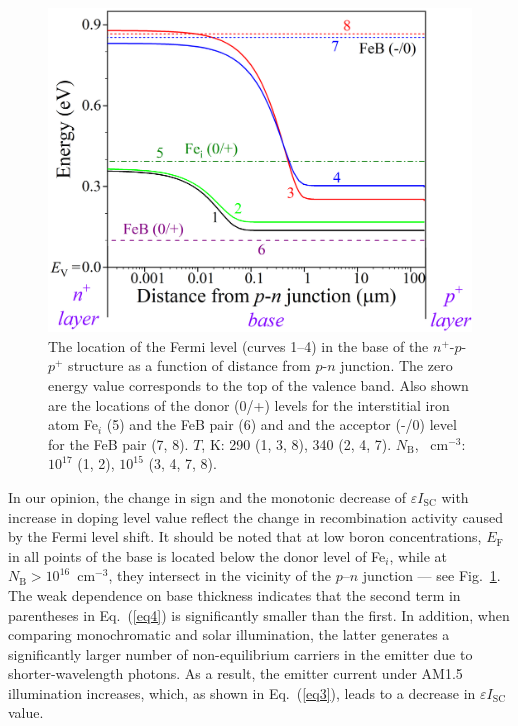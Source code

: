 \documentclass[a4paper,fleqn]{cas-sc}
\begin{document}
\begin{figure}
	\centering
     \includegraphics[width=0.49\linewidth]{Fig4.png}
	  \caption{The location of the Fermi level (curves 1--4) in the base of the $n^+$-$p$-$p^+$ structure
       as a function of distance from $p$-$n$ junction.
       The zero energy value corresponds to the top of the valence band.
       Also shown are the locations of
       the donor (0/+) levels for the interstitial iron atom Fe$_i$ (5)
       and the FeB pair (6) and 
       and the acceptor (-/0) level for the FeB pair (7, 8).
       $T$, K: 290 (1, 3, 8), 340 (2, 4, 7).
       $N_\mathrm{B}$, ~cm$^{-3}$: $10^{17}$ (1, 2), $10^{15}$ (3, 4, 7, 8).
}\label{fig4}
\end{figure}

In our opinion, the change in sign and the monotonic decrease of $\varepsilon I_\mathrm{SC}$
with increase in doping level value
reflect the change in recombination activity caused by the Fermi level shift.
It should be noted that
at low boron concentrations, $E_\mathrm{F}$ in all points of the base is located below the donor level of Fe$_i$,
while at $N_\mathrm{B}>10^{16}$~cm$^{-3}$,
they intersect in the vicinity of the $p$–$n$ junction --- see Fig.~\ref{fig4}.
The weak dependence on base thickness indicates that the second term in parentheses in Eq.~(\ref{eq4}) is significantly smaller than the first.
In addition, when comparing monochromatic and solar illumination,
the latter generates a significantly larger number of non-equilibrium carriers in the emitter
due to shorter-wavelength photons.
As a result, the emitter current under AM1.5 illumination increases,
which, as shown in Eq.~(\ref{eq3}), leads to a decrease in $\varepsilon I_\mathrm{SC}$ value.
\end{document}
